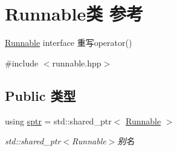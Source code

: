 \hypertarget{classRunnable}{}\section{Runnable类 参考}
\label{classRunnable}


\hyperlink{classRunnable}{Runnable} interface 重写operator()  




{\ttfamily \#include $<$runnable.\+hpp$>$}

\subsection*{Public 类型}
\begin{DoxyCompactItemize}
\item 
\mbox{\label{classRunnable_abe8d3066c7305401d6f0aad8e70780f2}} 
using \hyperlink{classRunnable_abe8d3066c7305401d6f0aad8e70780f2}{sptr} = std\+::shared\+\_\+ptr$<$ \hyperlink{classRunnable}{Runnable} $>$
\begin{DoxyCompactList}\small\item\em std\+::shared\+\_\+ptr$<$\+Runnable$>$别名 \end{DoxyCompactList}\end{DoxyCompactItemize}
